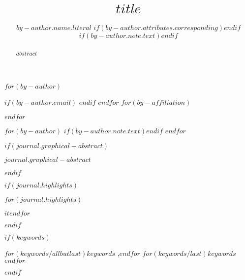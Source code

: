 
\begin{frontmatter}
\title{$title$}
$for(by-author)$\author[$for(by-author.affiliations)$$it.number$$endfor$]{$by-author.name.literal$%
$if(by-author.attributes.corresponding)$$endif$%
$if(by-author.note.text)$$endif$}
$if(by-author.email)$  $endif$
$endfor$
$for(by-affiliation)$

$endfor$

$for(by-author)$
$if(by-author.note.text)$$endif$
$endfor$
        
\begin{abstract}
$abstract$
\end{abstract}

$if(journal.graphical-abstract)$\begin{graphicalabstract}
$journal.graphical-abstract$
\end{graphicalabstract}
$endif$

$if(journal.highlights)$\begin{highlights}
$for(journal.highlights)$\item $it$$endfor$
\end{highlights}
$endif$

$if(keywords)$
\begin{keyword}
    $for(keywords/allbutlast)$$keywords$ \sep $endfor$
    $for(keywords/last)$$keywords$$endfor$
\end{keyword}
$endif$
\end{frontmatter}

